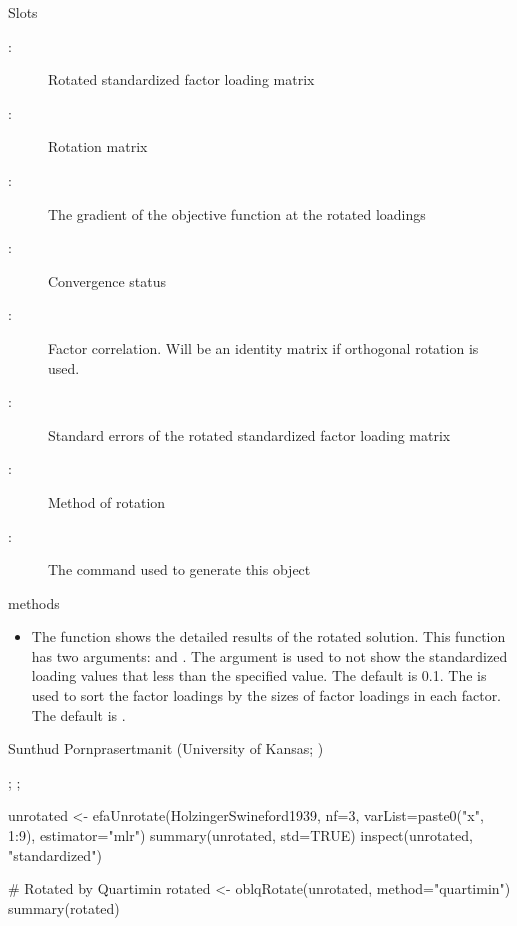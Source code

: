 \documentclass[a4paper]{book}
\begin{document}
%
\begin{Section}{Slots}
\begin{description}

\item[:] Rotated standardized factor loading matrix
\item[:] Rotation matrix
\item[:] The gradient of the objective function at the rotated loadings
\item[:] Convergence status
\item[:] Factor correlation. Will be an identity matrix if orthogonal rotation is used.
\item[:] Standard errors of the rotated standardized factor loading matrix
\item[:] Method of rotation
\item[:] The command used to generate this object

\end{description}

\end{Section}
%
\begin{Section}{methods}
\begin{itemize}

\item {} The  function shows the detailed results of the rotated solution. This function has two arguments:  and . The  argument is used to not show the standardized loading values that less than the specified value. The default is 0.1. The  is used to sort the factor loadings by the sizes of factor loadings in each factor. The default is .  

\end{itemize}

\end{Section}
%
\begin{Author}\relax
Sunthud Pornprasertmanit (University of Kansas; )
\end{Author}
%
\begin{SeeAlso}\relax
{}; ; 
\end{SeeAlso}
%
\begin{Examples}
\begin{ExampleCode}
unrotated <- efaUnrotate(HolzingerSwineford1939, nf=3, varList=paste0("x", 1:9), estimator="mlr")
summary(unrotated, std=TRUE)
inspect(unrotated, "standardized")

# Rotated by Quartimin
rotated <- oblqRotate(unrotated, method="quartimin")
summary(rotated)
\end{ExampleCode}
\end{Examples}
\end{document}
